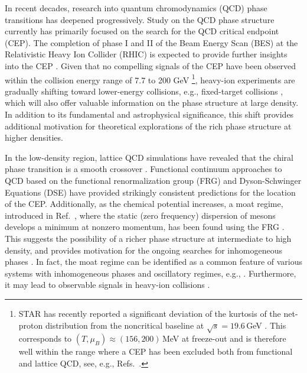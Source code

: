 \documentclass[reprint,english,superscriptaddress,preprintnumbers,amsmath,amssymb,aps,prd]{revtex4-2}
\newcommand{\colfab}[1]{\textcolor{magenta}{#1}}
\begin{document}
In recent decades, research into quantum chromodynamics (QCD) phase transitions has deepened progressively. Study on the QCD phase structure currently has primarily focused on the search for the QCD critical endpoint (CEP). The completion of phase I and II of the Beam Energy Scan (BES) at the Relativistic Heavy Ion Collider (RHIC) is expected to provide further insights into the CEP \cite{Chen:2024aom,Mondal:2024sil}. Given that no compelling signals of the CEP have been observed within the collision energy range of 7.7 to 200 GeV \footnote{STAR has recently reported a significant deviation of the kurtosis of the net-proton distribution from the noncritical baseline at $\sqrt{s} = 19.6$\,GeV \cite{STAR:2025zdq}. This corresponds to $(T,\mu_B) \approx (156,200)$\,MeV at freeze-out and is therefore well within the range where a CEP has been excluded both from functional and lattice QCD, see, e.g., Refs.\ \cite{Fu:2019hdw, Gao:2020fbl, Gunkel:2021oya, Bazavov:2017dus, Borsanyi:2025dyp}.}, heavy-ion experiments are gradually shifting toward lower-energy collisions, e.g., fixed-target collisions \cite{STAR:2022etb,CBM:2016kpk,Mackowiak-Pawlowska:2016qon,Kapishin:2020cwk,Sako:2019hzh}, which will also offer valuable information on the phase structure at large density. In addition to its fundamental and astrophysical significance, this shift provides additional motivation for theoretical explorations of the rich phase structure at higher densities.

In the low-density region, lattice QCD simulations have revealed that the chiral phase transition is a smooth crossover \cite{Bellwied:2015rza,Bazavov:2018mes}. Functional continuum approaches to QCD based on the functional renormalization group (FRG) \cite{Fu:2019hdw} and Dyson-Schwinger Equations (DSE) \cite{Gao:2020fbl, Gunkel:2021oya} have provided strikingly consistent predictions for the location of the CEP. Additionally, as the chemical potential increases, a moat regime, introduced in Ref.\ \cite{Pisarski:2021qof}, where the static (zero frequency) dispersion of mesons develops a minimum at nonzero momentum, has been found using the FRG \cite{Fu:2019hdw, Fu:2024rto}. 
This suggests the possibility of a richer phase structure at intermediate to high density, and provides motivation for the ongoing searches for inhomogeneous phases \cite{Motta:2023pks, Motta:2024agi, Motta:2024rvk, Fu:2024rto}. In fact, the moat regime can be identified as a common feature of various systems with inhomogeneous phases and oscillatory regimes, e.g., \cite{Fulde:1964zz, Hornreich:1975zz, Seul-Andelman:1995, Chakrabarty_2011, Sedrakyan:2013qja, Buballa:2014tba, Schindler:2019ugo, Pisarski:2020dnx, Schindler:2021otf, Nussinov:2024erh}. Furthermore, it may lead to observable signals in heavy-ion collisions \cite{Pisarski:2020gkx, Pisarski:2021qof, Rennecke:2021ovl, Rennecke:2023xhc, Nussinov:2024erh}.
\end{document}
